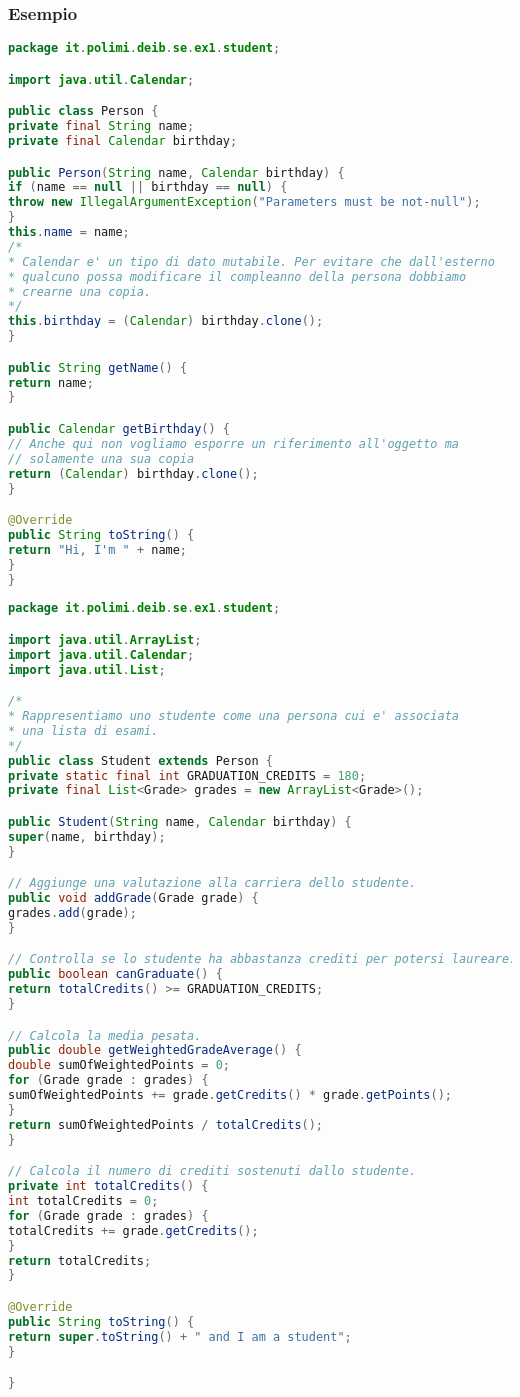 \documentclass{article}
\begin{document}
\subsubsection{Esempio}

\begin{lstlisting}[language=Java,escapechar=|]
package it.polimi.deib.se.ex1.student;

import java.util.Calendar;

public class Person {
private final String name;
private final Calendar birthday;

public Person(String name, Calendar birthday) {
if (name == null || birthday == null) {
throw new IllegalArgumentException("Parameters must be not-null");
}
this.name = name;
/*
* Calendar e' un tipo di dato mutabile. Per evitare che dall'esterno
* qualcuno possa modificare il compleanno della persona dobbiamo
* crearne una copia.
*/
this.birthday = (Calendar) birthday.clone();
}

public String getName() {
return name;
}

public Calendar getBirthday() {
// Anche qui non vogliamo esporre un riferimento all'oggetto ma
// solamente una sua copia
return (Calendar) birthday.clone();
}

@Override
public String toString() {
return "Hi, I'm " + name;
}
}
\end{lstlisting}
\begin{lstlisting}[language=Java,escapechar=|]
package it.polimi.deib.se.ex1.student;

import java.util.ArrayList;
import java.util.Calendar;
import java.util.List;

/*
* Rappresentiamo uno studente come una persona cui e' associata
* una lista di esami.
*/
public class Student extends Person {
private static final int GRADUATION_CREDITS = 180;
private final List<Grade> grades = new ArrayList<Grade>();

public Student(String name, Calendar birthday) {
super(name, birthday);
}

// Aggiunge una valutazione alla carriera dello studente.
public void addGrade(Grade grade) {
grades.add(grade);
}

// Controlla se lo studente ha abbastanza crediti per potersi laureare.
public boolean canGraduate() {
return totalCredits() >= GRADUATION_CREDITS;
}

// Calcola la media pesata.
public double getWeightedGradeAverage() {
double sumOfWeightedPoints = 0;
for (Grade grade : grades) {
sumOfWeightedPoints += grade.getCredits() * grade.getPoints();
}
return sumOfWeightedPoints / totalCredits();
}

// Calcola il numero di crediti sostenuti dallo studente.
private int totalCredits() {
int totalCredits = 0;
for (Grade grade : grades) {
totalCredits += grade.getCredits();
}
return totalCredits;
}

@Override
public String toString() {
return super.toString() + " and I am a student";
}

}
\end{lstlisting}
\end{document}
